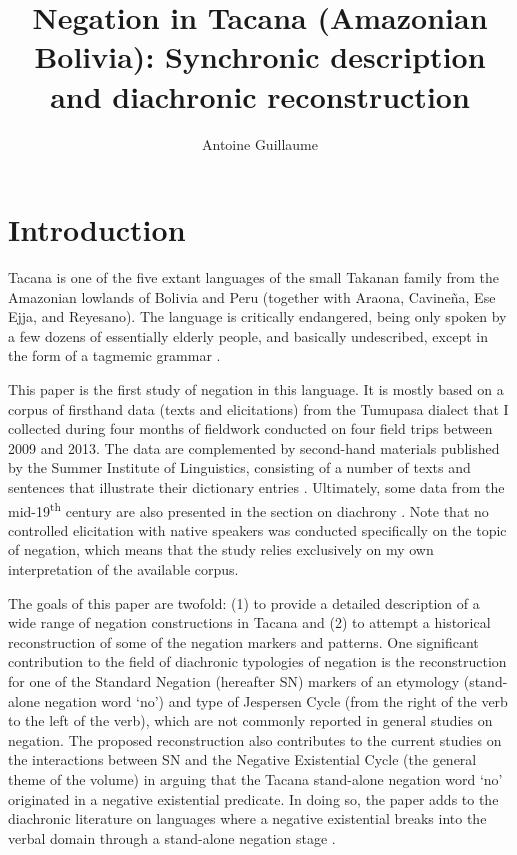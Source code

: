\documentclass[output=paper,draft,draftmode,colorlinks,citecolor=brown]{langscibook}
\author{Antoine Guillaume\affiliation{Laboratoire Dynamique du Langage (CNRS \& Université Lumière Lyon 2)}}
\title{Negation in Tacana (Amazonian Bolivia): Synchronic description and diachronic reconstruction}
\begin{document}
\AffiliationsWithoutIndexing{}
\maketitle

\section{Introduction}

Tacana %
is one of the five extant languages of the small Takanan family from
the Amazonian lowlands of Bolivia and Peru (together with Araona, Cavineña, Ese Ejja, and Reyesano). The language is critically endangered, being
only spoken by a few dozens of essentially elderly people, and basically undescribed,
except in the form of a tagmemic grammar \parencites{Ottaviano1965}{Ottaviano1967}.

This paper is the first study of negation in this language. It is mostly
based on a corpus of firsthand data (texts and elicitations) from the Tumupasa
dialect that I collected during four months of fieldwork conducted on
four field trips between 2009 and 2013. The data are complemented by second-hand materials published by the Summer Institute of Linguistics, consisting
of a number of texts \citep{Ottaviano1980} and sentences that illustrate their
dictionary entries \citep{Ottaviano1989}. Ultimately,
some data from the mid-19\textsuperscript{th} century are also presented
in the section on diachrony \parencites{LafoneQuevedo1902}. Note that no
controlled elicitation with native speakers was conducted specifically on
the topic of negation, which means that the study relies exclusively on my
own interpretation of the available corpus.

The goals of this paper are twofold: (1) to provide a detailed
description of a wide range of negation constructions in Tacana and
(2) to attempt a historical reconstruction of some of the negation
markers and patterns. One significant contribution to the field of
diachronic typologies of negation is the reconstruction for one of the
Standard Negation (hereafter SN) markers of an etymology (stand-alone
negation word `no') and type of Jespersen Cycle (from the right of the verb
to the left of the verb), which are not commonly reported in general
studies on negation.  The proposed reconstruction also contributes to the
current studies on the interactions between SN and the Negative Existential
Cycle (the general theme of the volume) in arguing that the Tacana
stand-alone negation word `no' originated in a negative existential
predicate. In doing so, the paper adds to the diachronic literature on
languages where a negative existential breaks into the verbal domain
through a stand-alone negation stage
\parencites[10, 13--14]{Croft1991}[127ff]{Veselinova2013}[155--156]{Veselinova2016}.
\end{document}
